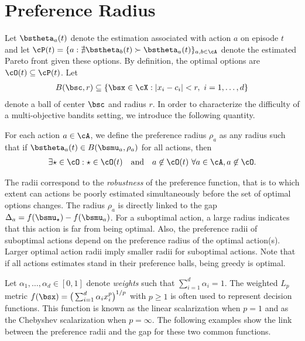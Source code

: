 
\section{Preference Radius}
\label{sec:preference_radius}

Let $\bstheta_a(t)$ denote the estimation associated with action $a$ on episode $t$ and let $\cP(t) = \{ a : \nexists \bstheta_b(t) \succ \bstheta_a(t) \}_{a, b \in \cA}$ denote the estimated Pareto front given these options. By definition, the optimal options are $\cO(t) \subseteq \cP(t)$. Let
\begin{align*}
    B(\bsc, r) \subseteq \{ \bsx \in \cX : |x_i - c_i| < r, ~ i = 1, \dots, d \}
\end{align*}
denote a ball of center $\bsc$ and radius $r$. In order to characterize the difficulty of a multi-objective bandits setting, we introduce the following quantity.
%
\begin{definition}
For each action $a \in \cA$, we define the preference radius $\rho_a$ as any radius such that if $\bstheta_a(t) \in B(\bsmu_a, \rho_a)$ for all actions, then
\begin{align*}
    \exists \star \in \cO : \star \in \cO(t) \quad \text{and} \quad a \not\in \cO(t) ~ \forall a \in \cA, a \not\in \cO.
\end{align*}
\end{definition}
%
The radii correspond to the \emph{robustness} of the preference function, that is to which extent can actions be poorly estimated simultaneously before the set of optimal options changes. The radius $\rho_a$ is directly linked to the gap $\Delta_a = f(\bsmu_\star)- f(\bsmu_a)$. For a suboptimal action, a large radius indicates that this action is far from being optimal. Also, the preference radii of suboptimal actions depend on the preference radius of the optimal action(s). Larger optimal action radii imply smaller radii for suboptimal actions. Note that if all actions estimates stand in their preference balls, being greedy is optimal.

Let $\alpha_1, \dots, \alpha_d \in [0, 1]$ denote \emph{weights} such that $\sum_{i = 1}^d \alpha_i = 1$. The weighted $L_p$ metric $f(\bsx)= \big( \sum_{i = 1}^d \alpha_i x_i^p \big)^{1/p}$ with $p \geq 1$ is often used to represent decision functions. This function is known as the linear scalarization when $p = 1$ and as the Chebyshev scalarization when $p = \infty$. The following examples show the link between the preference radii and the gap for these two common functions.

